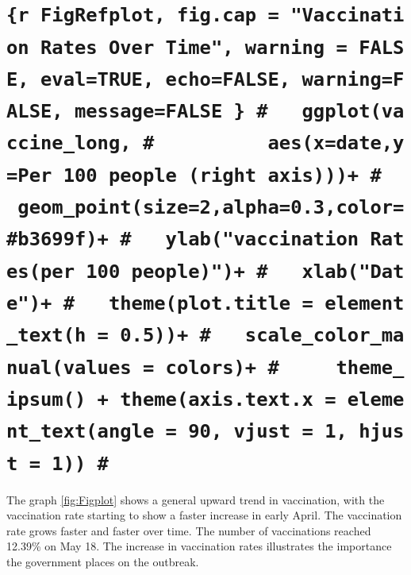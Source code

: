 \documentclass[11pt,a4paper,]{article}
\begin{document}
\hypertarget{r-figrefplot-fig.cap-vaccination-rates-over-time-warning-false-evaltrue-echofalse-warningfalse-messagefalse-ggplotvaccine_long-aesxdateyper-100-people-right-axis-geom_pointsize2alpha0.3colorb3699f-ylabvaccination-ratesper-100-people-xlabdate-themeplot.title-element_texth-0.5-scale_color_manualvalues-colors-theme_ipsum-themeaxis.text.x-element_textangle-90-vjust-1-hjust-1}{%
\section{\texorpdfstring{\texttt{\{r\ FigRefplot,\ fig.cap\ =\ "Vaccination\ Rates\ Over\ Time",\ warning\ =\ FALSE,\ eval=TRUE,\ echo=FALSE,\ warning=FALSE,\ message=FALSE\ \}\ \#\ \ \ ggplot(vaccine\_long,\ \#\ \ \ \ \ \ \ \ \ \ aes(x=date,y=\textasciigrave{}Per\ 100\ people\ (right\ axis)\textasciigrave{}))+\ \#\ \ \ geom\_point(size=2,alpha=0.3,color=\textquotesingle{}\#b3699f\textquotesingle{})+\ \#\ \ \ ylab("vaccination\ Rates(per\ 100\ people)")+\ \#\ \ \ xlab("Date")+\ \#\ \ \ theme(plot.title\ =\ element\_text(h\ =\ 0.5))+\ \#\ \ \ scale\_color\_manual(values\ =\ colors)+\ \#\ \ \ \ \ theme\_ipsum()\ +\ theme(axis.text.x\ =\ element\_text(angle\ =\ 90,\ vjust\ =\ 1,\ hjust\ =\ 1))\ \#}}{\{r FigRefplot, fig.cap = "Vaccination Rates Over Time", warning = FALSE, eval=TRUE, echo=FALSE, warning=FALSE, message=FALSE \} \#   ggplot(vaccine\_long, \#          aes(x=date,y=`Per 100 people (right axis)`))+ \#   geom\_point(size=2,alpha=0.3,color='\#b3699f')+ \#   ylab("vaccination Rates(per 100 people)")+ \#   xlab("Date")+ \#   theme(plot.title = element\_text(h = 0.5))+ \#   scale\_color\_manual(values = colors)+ \#     theme\_ipsum() + theme(axis.text.x = element\_text(angle = 90, vjust = 1, hjust = 1)) \#}}\label{r-figrefplot-fig.cap-vaccination-rates-over-time-warning-false-evaltrue-echofalse-warningfalse-messagefalse-ggplotvaccine_long-aesxdateyper-100-people-right-axis-geom_pointsize2alpha0.3colorb3699f-ylabvaccination-ratesper-100-people-xlabdate-themeplot.title-element_texth-0.5-scale_color_manualvalues-colors-theme_ipsum-themeaxis.text.x-element_textangle-90-vjust-1-hjust-1}}

The graph \ref{fig:Figplot} shows a general upward trend in vaccination, with the vaccination rate starting to show a faster increase in early April. The vaccination rate grows faster and faster over time. The number of vaccinations reached 12.39\% on May 18. The increase in vaccination rates illustrates the importance the government places on the outbreak.
\end{document}
